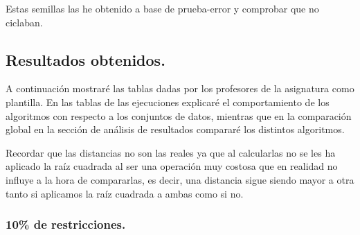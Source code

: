 \documentclass[12pt, spanish]{article}
\begin{document}
Estas semillas las he obtenido a base de prueba-error y comprobar que no ciclaban.

\newpage

\subsection{Resultados obtenidos.}

A continuación mostraré las tablas dadas por los profesores de la asignatura como plantilla. En las tablas de las ejecuciones explicaré el comportamiento de los algoritmos con respecto a los conjuntos de datos, mientras que en la comparación global en la sección de análisis de resultados compararé los distintos algoritmos.

Recordar que las distancias no son las reales ya que al calcularlas no se les ha aplicado la raíz cuadrada al ser una operación muy costosa que en realidad no influye a la hora de compararlas, es decir, una distancia sigue siendo mayor a otra tanto si aplicamos la raíz cuadrada a ambas como si no.

\subsubsection{10\% de restricciones.}
\end{document}
